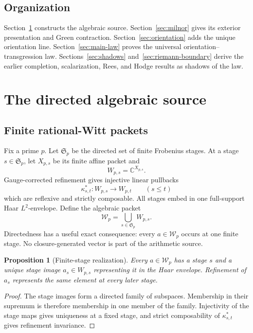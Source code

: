 \documentclass[11pt]{article}
\newtheorem{proposition}[theorem]{Proposition}
\theoremstyle{definition}
\theoremstyle{remark}
\newcommand{\C}{\mathbb C}
\newcommand{\cW}{\mathcal W}
\begin{document}
\subsection*{Organization}

Section~\ref{sec:algebraic-source} constructs the algebraic source.
Section~\ref{sec:milnor} gives its exterior presentation and Green
contraction.  Section~\ref{sec:orientation} adds the unique orientation
line.  Section~\ref{sec:main-law} proves the universal
orientation--transgression law.  Sections~\ref{sec:shadows}
and~\ref{sec:riemann-boundary} derive the earlier completion,
scalarization, Rees, and Hodge results as shadows of the law.

\section{The directed algebraic source}
\label{sec:algebraic-source}

\subsection{Finite rational-Witt packets}

Fix a prime \(p\).  Let \(\mathfrak S_p\) be the directed set of finite
Frobenius stages.  At a stage \(s\in\mathfrak S_p\), let \(X_{p,s}\) be its
finite affine packet and
\[
                         W_{p,s}=\C^{X_{p,s}}.
\tag{2.1}\label{eq:finite-stage}
\]
Gauge-corrected refinement gives injective linear pullbacks
\[
                  \kappa_{s,t}^{*}:W_{p,s}\longrightarrow W_{p,t}
                  \qquad(s\le t)
\tag{2.2}\label{eq:gauge-pullback}
\]
which are reflexive and strictly composable.  All stages embed in one
full-support Haar \(L^2\)-envelope.  Define the algebraic packet
\[
                  \cW_p=\bigcup_{s\in\mathfrak S_p}W_{p,s}.
\tag{2.3}\label{eq:algebraic-packet}
\]
Directedness has a useful exact consequence: every \(a\in\cW_p\) occurs at
one finite stage.  No closure-generated vector is part of the arithmetic
source.

\begin{proposition}[Finite-stage realization]
\label{prop:finite-stage-realization}
Every \(a\in\cW_p\) has a stage \(s\) and a unique stage image
\(a_s\in W_{p,s}\) representing it in the Haar envelope.  Refinement of
\(a_s\) represents the same element at every later stage.
\end{proposition}

\begin{proof}
The stage images form a directed family of subspaces.  Membership in their
supremum is therefore membership in one member of the family.  Injectivity
of the stage maps gives uniqueness at a fixed stage, and strict
composability of \(\kappa_{s,t}^{*}\) gives refinement invariance.
\end{proof}
\end{document}
